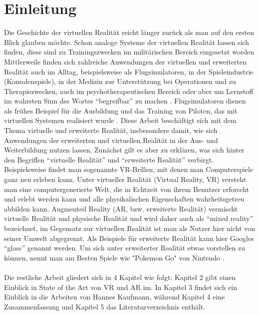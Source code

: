 \documentclass[deutsch]{llncs}
\begin{document}
\tableofcontents
\newpage
{}
\section{Einleitung}
\label{sec:intro}
Die Geschichte der virtuellen Realität reicht länger zurück als man auf den ersten Blick glauben möchte. Schon analoge Systeme der virtuellen Realität lassen sich finden, diese sind zu Trainingszwecken im militärischen Bereich eingesetzt worden \cite{vrnerds}
Mittlerweile finden sich zahlreiche Anwendungen der virtuellen und erweiterten Realität auch im Alltag, beispielsweise als Flugsimulatoren, in der Spieleindustrie (Konsolenspiele), in der Medizin zur Unterstützung bei Operationen und zu Therapiezwecken, auch im psychotherapeutischen Bereich oder aber um Lernstoff im wahrsten Sinn des Wortes ``begreifbar'' zu machen \cite{Klampfer}. 
Flugsimulatoren dienen als frühes Beispiel für die Ausbildung und das Training von Piloten, das mit virtuellen Systemen realisiert wurde  \cite{Klampfer}.
Diese Arbeit beschäftigt sich mit dem Thema virtuelle und erweiterte Realität, insbesondere damit, wie sich Anwendungen der erweiterten und virtuellen Realität in der Aus- und Weiterbildung nutzen lassen. 
Zunächst gilt es aber zu erklären, was sich hinter den Begriffen ``virtuelle Realität'' und ``erweiterte Realität'' verbirgt. 
Beispielsweise findet man sogenannte VR-Brillen, mit denen man Computerspiele ganz neu erleben kann.
\label{sec:typo}
Unter virtueller Realität (Virtual Reality, VR) versteht man eine computergenerierte Welt, die in Echtzeit von ihrem Benutzer erforscht und erlebt werden kann und alle physikalischen Eigenschaften wahrheitsgetreu abbilden kann. 
Augmented Reality (AR, bzw. erweiterte Realität) vermischt virtuelle Realität und physische Realität und wird daher auch als ``mixed reality'' bezeichnet, im Gegensatz zur virtuellen Realität ist man als Nutzer hier nicht von seiner Umwelt abgegrenzt.
Als Beispiele für erweiterte Realität kann hier Googles ``glass'' genannt werden. 
Um sich unter erweiterter Realität etwas vorstellen zu können, nennt man am Besten Spiele wie "Pokemon Go"  von Nintendo \cite{Klampfer}.\\
\noindent \\
Die restliche Arbeit gliedert sich in 4 Kapitel wie folgt: 
Kapitel 2 gibt einen Einblick in State of the Art von VR und AR im. In Kapitel 3 findet sich ein Einblick in die Arbeiten von Hannes Kaufmann, während Kapitel 4 eine Zusammenfassung und Kapitel 5 das Literaturverzeichnis enthält.
\end{document}
